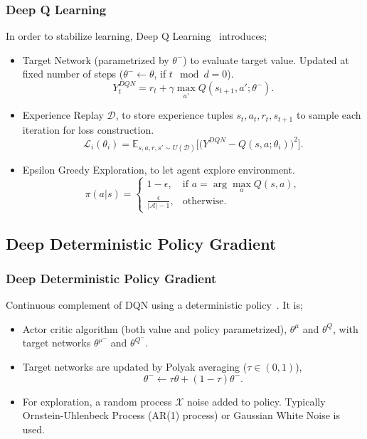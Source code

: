 \documentclass{beamer}
\begin{document}
\begin{frame}
\frametitle{Deep Q Learning}
In order to stabilize learning, Deep Q Learning~\cite{mnih_human-level_2015, mnih_playing_2013} introduces;
\begin{itemize}
	\item Target Network (parametrized by $\theta^-$) to evaluate target value. Updated at fixed number of steps ($\theta^- \leftarrow \theta$, if $t\mod d = 0$).
	\begin{equation}
	\label{eqn:dqn_ntarget}
	Y_t^{DQN} = r_t + \gamma \max_{a'} Q(s_{t+1},a';\theta^-).
	\end{equation}
	\item Experience Replay $\mathcal{D}$, to store experience tuples $s_t,a_t,r_t,s_{t+1}$ to sample each iteration for loss construction. 
	\begin{equation}
	\label{eqn:dqn_loss}
	\mathcal{L}_i(\theta_i) = \mathbb{E}_{s,a,r,s'\sim U(\mathcal{D})}\Big[\big( Y^{DQN} - Q(s,a;\theta_i) \big) ^ 2 \Big].
	\end{equation}
	\item Epsilon Greedy Exploration, to let agent explore environment. 
	\begin{equation}
	\label{eqn:egreedy_policy}
	\pi(a|s) = 
	\begin{cases}
	1-\epsilon,   & \text{if } a = \arg \max_{a} Q(s, a), \\
	\frac{\epsilon}{|\mathcal{A}|-1},     & \text{otherwise}.
	\end{cases}
	\end{equation}
\end{itemize}
\end{frame}
\subsection{Deep Deterministic Policy Gradient}
\begin{frame}
\frametitle{Deep Deterministic Policy Gradient}
Continuous complement of DQN using a deterministic policy~\cite{lillicrap_continuous_2019}. It is;
\begin{itemize}
	\item Actor critic algorithm (both value and policy parametrized), $\theta^{\mu}$ and $\theta^{Q}$, with target networks $\theta^{\mu^-}$ and $\theta^{Q^-}$. 
	\item Target networks are updated by Polyak averaging ($\tau \in (0,1)$),
	\begin{equation}
	\label{eqn:target_update}
	\theta^- \leftarrow \tau \theta + (1-\tau) \theta^- .
	\end{equation}
	\item For exploration, a random process $\mathcal{X}$ noise added to policy. Typically Ornstein-Uhlenbeck Process (AR(1) process) \cite{uhlenbeck_theory_1930} or Gaussian White Noise is used.
\end{itemize}
\end{frame}
\end{document}
